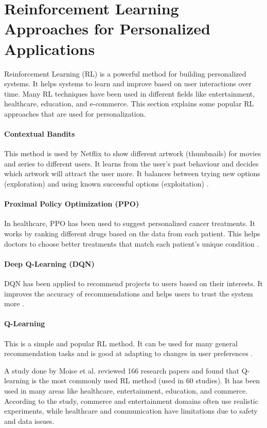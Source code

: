 \section{Reinforcement Learning Approaches for Personalized Applications}

Reinforcement Learning (RL) is a powerful method for building personalized systems. It helps systems to learn and improve based on user interactions over time. Many RL techniques have been used in different fields like entertainment, healthcare, education, and e-commerce. This section explains some popular RL approaches that are used for personalization.

\paragraph*{Contextual Bandits} This method is used by Netflix to show different artwork (thumbnails) for movies and series to different users. It learns from the user's past behaviour and decides which artwork will attract the user more. It balances between trying new options (exploration) and using known successful options (exploitation) \cite{netflix2018artwork}.

\paragraph*{Proximal Policy Optimization (PPO)} In healthcare, PPO has been used to suggest personalized cancer treatments. It works by ranking different drugs based on the data from each patient. This helps doctors to choose better treatments that match each patient's unique condition \cite{liu2022deep}.

\paragraph*{Deep Q-Learning (DQN)} DQN has been applied to recommend projects to users based on their interests. It improves the accuracy of recommendations and helps users to trust the system more \cite{wang2019personalized}.

\paragraph*{Q-Learning} This is a simple and popular RL method. It can be used for many general recommendation tasks and is good at adapting to changes in user preferences \cite{edirisinghe2020reinforcement}.

A study done by Moise et al. \cite{moise2020reinforcement} reviewed 166 research papers and found that Q-learning is the most commonly used RL method (used in 60 studies). It has been used in many areas like healthcare, entertainment, education, and commerce. According to the study, commerce and entertainment domains often use realistic experiments, while healthcare and communication have limitations due to safety and data issues.

